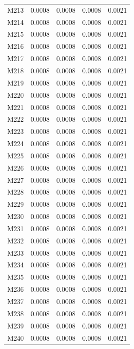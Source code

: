 \begin{longtable}{lrrrr}
M213 & 0.0008 & 0.0008 & 0.0008 & 0.0021 \\
M214 & 0.0008 & 0.0008 & 0.0008 & 0.0021 \\
M215 & 0.0008 & 0.0008 & 0.0008 & 0.0021 \\
M216 & 0.0008 & 0.0008 & 0.0008 & 0.0021 \\
M217 & 0.0008 & 0.0008 & 0.0008 & 0.0021 \\
M218 & 0.0008 & 0.0008 & 0.0008 & 0.0021 \\
M219 & 0.0008 & 0.0008 & 0.0008 & 0.0021 \\
M220 & 0.0008 & 0.0008 & 0.0008 & 0.0021 \\
M221 & 0.0008 & 0.0008 & 0.0008 & 0.0021 \\
M222 & 0.0008 & 0.0008 & 0.0008 & 0.0021 \\
M223 & 0.0008 & 0.0008 & 0.0008 & 0.0021 \\
M224 & 0.0008 & 0.0008 & 0.0008 & 0.0021 \\
M225 & 0.0008 & 0.0008 & 0.0008 & 0.0021 \\
M226 & 0.0008 & 0.0008 & 0.0008 & 0.0021 \\
M227 & 0.0008 & 0.0008 & 0.0008 & 0.0021 \\
M228 & 0.0008 & 0.0008 & 0.0008 & 0.0021 \\
M229 & 0.0008 & 0.0008 & 0.0008 & 0.0021 \\
M230 & 0.0008 & 0.0008 & 0.0008 & 0.0021 \\
M231 & 0.0008 & 0.0008 & 0.0008 & 0.0021 \\
M232 & 0.0008 & 0.0008 & 0.0008 & 0.0021 \\
M233 & 0.0008 & 0.0008 & 0.0008 & 0.0021 \\
M234 & 0.0008 & 0.0008 & 0.0008 & 0.0021 \\
M235 & 0.0008 & 0.0008 & 0.0008 & 0.0021 \\
M236 & 0.0008 & 0.0008 & 0.0008 & 0.0021 \\
M237 & 0.0008 & 0.0008 & 0.0008 & 0.0021 \\
M238 & 0.0008 & 0.0008 & 0.0008 & 0.0021 \\
M239 & 0.0008 & 0.0008 & 0.0008 & 0.0021 \\
M240 & 0.0008 & 0.0008 & 0.0008 & 0.0021 \\
\end{longtable}
